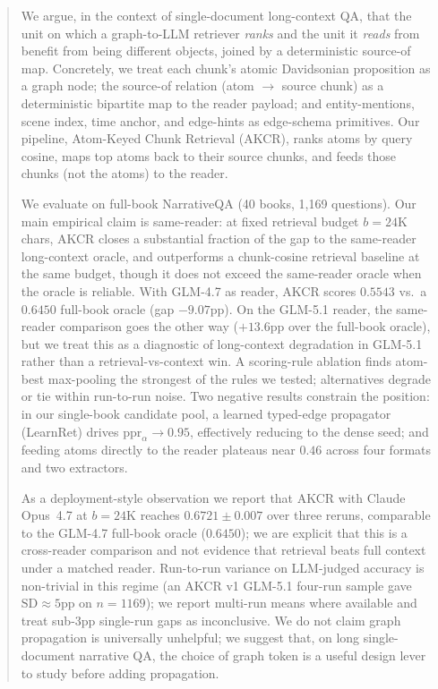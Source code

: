 \documentclass{article}
\theoremstyle{plain}
\theoremstyle{definition}
\theoremstyle{remark}
\begin{document}
\begin{abstract}
  We argue, in the context of single-document long-context QA, that the unit on
  which a graph-to-LLM retriever \emph{ranks} and the unit it \emph{reads} from
  benefit from being different objects, joined by a deterministic source-of
  map. Concretely, we treat each chunk's atomic Davidsonian proposition as a
  graph node; the source-of relation (atom $\to$ source chunk) as a deterministic
  bipartite map to the reader payload; and entity-mentions, scene index, time
  anchor, and edge-hints as edge-schema primitives. Our pipeline, Atom-Keyed
  Chunk Retrieval (AKCR), ranks atoms by query cosine, maps top atoms back to
  their source chunks, and feeds those chunks (not the atoms) to the reader.

  We evaluate on full-book NarrativeQA (40 books, 1{,}169 questions). Our main
  empirical claim is same-reader: at fixed retrieval budget $b\!=\!24$K chars,
  AKCR closes a substantial fraction of the gap to the same-reader long-context
  oracle, and outperforms a chunk-cosine retrieval baseline at the same budget,
  though it does not exceed the same-reader oracle when the oracle is
  reliable. With GLM-4.7 as reader, AKCR scores $0.5543$ vs.\ a $0.6450$
  full-book oracle (gap $-9.07$pp). On the GLM-5.1 reader, the same-reader
  comparison goes the other way ($+13.6$pp over the full-book oracle), but
  we treat this as a diagnostic of long-context degradation in GLM-5.1 rather
  than a retrieval-vs-context win. A scoring-rule ablation finds atom-best
  max-pooling the strongest of the rules we tested; alternatives degrade or
  tie within run-to-run noise. Two negative results constrain the position:
  in our single-book candidate pool, a learned typed-edge propagator
  (LearnRet) drives $\mathrm{ppr}_\alpha\!\to\!0.95$, effectively reducing to
  the dense seed; and feeding atoms directly to the reader plateaus near
  $0.46$ across four formats and two extractors.

  As a deployment-style observation we report that AKCR with Claude Opus~4.7
  at $b\!=\!24$K reaches $0.6721 \pm 0.007$ over three reruns, comparable to
  the GLM-4.7 full-book oracle ($0.6450$); we are explicit that this is a
  cross-reader comparison and not evidence that retrieval beats full context
  under a matched reader. Run-to-run variance on LLM-judged accuracy is
  non-trivial in this regime (an AKCR v1 GLM-5.1 four-run sample gave
  $\mathrm{SD}\!\approx\!5$pp on $n\!=\!1169$); we report multi-run means
  where available and treat sub-3pp single-run gaps as inconclusive. We do
  not claim graph propagation is universally unhelpful; we suggest that, on
  long single-document narrative QA, the choice of graph token is a useful
  design lever to study before adding propagation.
\end{abstract}
\end{document}
